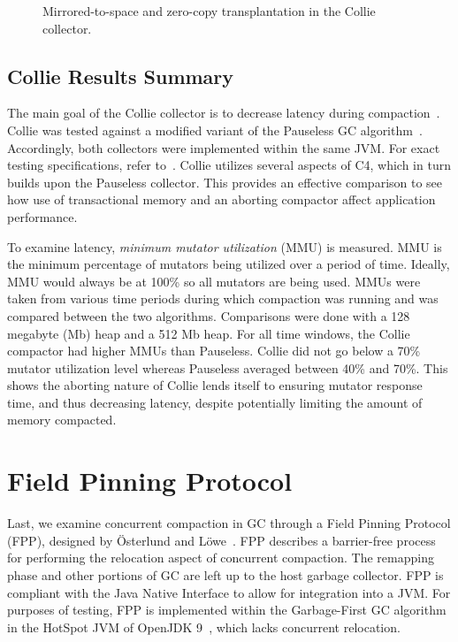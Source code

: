 \documentclass{sig-alternate}
\begin{document}
\begin{figure}
\centering
{}
\caption{Mirrored-to-space and zero-copy transplantation in the Collie collector.}
\label{fig:collieMirrored}
\end{figure}


\subsection{Collie Results Summary}
\label{sec:collieResults}


The main goal of the Collie collector is to decrease latency
during compaction~\cite{Iyengar:Collie}. Collie was tested 
against a modified variant of the Pauseless GC algorithm~\cite{Click:Pauseless}.
Accordingly, both collectors were implemented within the same JVM. For exact
testing specifications, refer to~\cite{Iyengar:Collie}. Collie
utilizes several aspects of C4, which in turn builds upon the Pauseless
collector. This provides an effective comparison to see how 
use of transactional memory and an aborting compactor affect application performance. 

To examine latency, \emph{minimum mutator utilization} (MMU) is measured.
MMU is the minimum percentage of mutators being utilized over a period of time. Ideally,
MMU would always be at 100\% so all mutators are being used. 
MMUs were taken from various time periods during which
compaction was running and was compared between the two algorithms. Comparisons were done
with a 128 megabyte (Mb) heap and a 512 Mb heap. For all time windows, the Collie compactor
had higher MMUs than Pauseless. Collie did not go below a 70\% mutator utilization 
level whereas Pauseless averaged between 40\% and 70\%. 
This shows the aborting nature of Collie
lends itself to ensuring mutator response time, and thus decreasing latency, 
despite potentially limiting the amount of memory compacted.


\section{Field Pinning Protocol}
\label{sec:fpp}

Last, we examine concurrent compaction in GC through a Field Pinning
Protocol (FPP), designed by \"{O}sterlund and L\"{o}we~\cite{Osterlund:FPP}.
FPP describes a barrier-free process for performing the relocation aspect
of concurrent compaction. The remapping phase and other portions
of GC are left up to the host garbage collector. FPP is compliant with the Java Native Interface
to allow for integration into a JVM. For purposes of testing, FPP 
is implemented within the Garbage-First GC algorithm in the HotSpot JVM 
of OpenJDK 9~\cite{Detlefs:G1}, which lacks concurrent relocation.
\end{document}
